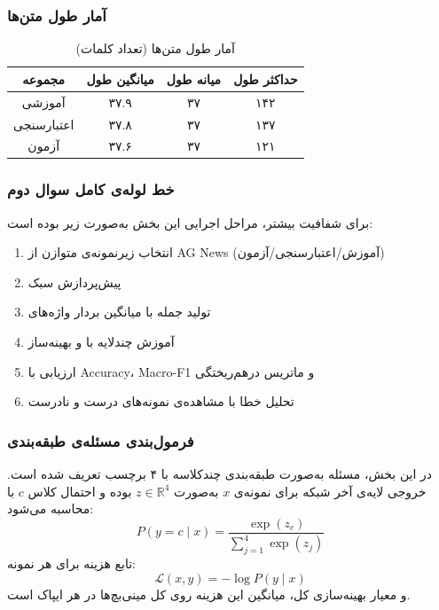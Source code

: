 \documentclass[12pt,a4paper]{article}
\begin{document}
\subsubsection{آمار طول متن‌ها}
\begin{table}[H]
\centering
\begin{tabular}{|c|c|c|c|}
\hline
\textbf{مجموعه} & \textbf{میانگین طول} & \textbf{میانه طول} & \textbf{حداکثر طول} \\
\hline
آموزشی & ۳۷.۹ & ۳۷ & ۱۴۲ \\
اعتبارسنجی & ۳۷.۸ & ۳۷ & ۱۳۷ \\
آزمون & ۳۷.۶ & ۳۷ & ۱۲۱ \\
\hline
\end{tabular}
\caption{آمار طول متن‌ها (تعداد کلمات)}
\end{table}

\subsubsection{خط لوله‌ی کامل سوال دوم}
برای شفافیت بیشتر، مراحل اجرایی این بخش به‌صورت زیر بوده است:
\begin{enumerate}
\item انتخاب زیرنمونه‌ی متوازن از AG News (آموزش/اعتبارسنجی/آزمون)
\item پیش‌پردازش سبک 
\item تولید  جمله با میانگین بردار واژه‌های 
\item آموزش  چندلایه با  و بهینه‌ساز 
\item ارزیابی با Accuracy، Macro-F1 و ماتریس درهم‌ریختگی
\item تحلیل خطا با مشاهده‌ی نمونه‌های درست و نادرست
\end{enumerate}

\subsubsection{فرمول‌بندی مسئله‌ی طبقه‌بندی}
در این بخش، مسئله به‌صورت طبقه‌بندی چندکلاسه با ۴ برچسب تعریف شده است. خروجی لایه‌ی آخر شبکه برای نمونه‌ی \(x\) به‌صورت \(z \in \mathbb{R}^4\) بوده و احتمال کلاس \(c\) با  محاسبه می‌شود:
\begin{equation}
P(y=c \mid x) = \frac{\exp(z_c)}{\sum_{j=1}^{4}\exp(z_j)}
\end{equation}
تابع هزینه برای هر نمونه:
\begin{equation}
\mathcal{L}(x,y) = -\log P(y \mid x)
\end{equation}
و معیار بهینه‌سازی کل، میانگین این هزینه روی کل مینی‌بچ‌ها در هر ایپاک است.
\end{document}
